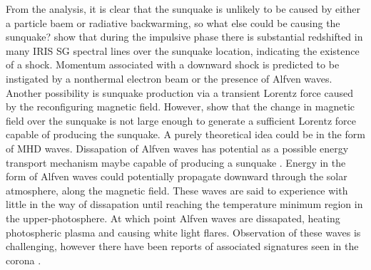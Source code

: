 From the analysis, it is clear that the sunquake is unlikely to be caused by either a particle baem or radiative backwarming, so what else could be causing the sunquake? \cite{2015ApJ...812...35M} show that during the impulsive phase there is substantial redshifted in many IRIS SG spectral lines over the sunquake location, indicating the existence of a shock. Momentum associated with a downward shock is predicted to be instigated by a nonthermal electron beam or the presence of Alfven waves. Another possibility is sunquake production via a transient Lorentz force caused by the reconfiguring magnetic field. However, \cite{2014ApJ...796...85J} show that the change in magnetic field over the sunquake is not large enough to generate a sufficient Lorentz force capable of producing the sunquake. A purely theoretical idea could be in the form of MHD waves. Dissapation of Alfven waves \citep{1982SoPh...80...99E} has potential as a possible energy transport mechanism maybe capable of producing a sunquake \citep{2015ApJ...812...35M}. Energy in the form of Alfven waves could potentially propagate downward through the solar atmosphere, along the magnetic field. These waves are said to experience with little in the way of dissapation until reaching the temperature minimum region in the upper-photosphere. At which point Alfven waves are dissapated, heating photospheric plasma and causing white light flares. Observation of these waves is challenging, however there have been reports of associated signatures seen in the corona \citep{2009A&A...501L..15B}. 

